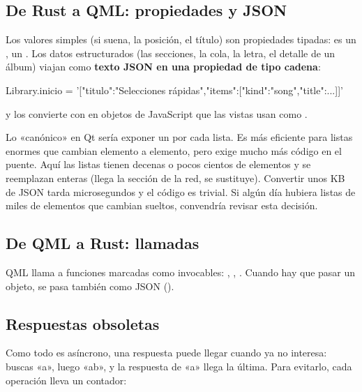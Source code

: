 \subsection{De Rust a QML: propiedades y JSON}

Los valores simples (si suena, la posición, el título) son propiedades tipadas:
 es un ,  un . Los datos
estructurados (las secciones, la cola, la letra, el detalle de un álbum) viajan como
\textbf{texto JSON en una propiedad de tipo cadena}:

\begin{codigo}
Library.inicio = '[{"titulo":"Selecciones rápidas","items":[{"kind":"song","title":...}]}]'
\end{codigo}

y  los convierte con  en objetos de JavaScript que las vistas
usan como .

\begin{porque}
Lo «canónico» en Qt sería exponer un  por cada lista. Es más
eficiente para listas enormes que cambian elemento a elemento, pero exige mucho más código en
el puente. Aquí las listas tienen decenas o pocos cientos de elementos y se reemplazan enteras
(llega la sección de la red, se sustituye). Convertir unos KB de JSON tarda microsegundos y el
código es trivial. Si algún día hubiera listas de miles de elementos que cambian sueltos,
convendría revisar esta decisión.
\end{porque}

\subsection{De QML a Rust: llamadas}

QML llama a funciones marcadas como invocables: ,
, . Cuando hay que
pasar un objeto, se pasa también como JSON ().

\subsection{Respuestas obsoletas}

Como todo es asíncrono, una respuesta puede llegar cuando ya no interesa: buscas «a», luego
«ab», y la respuesta de «a» llega la última. Para evitarlo, cada operación lleva un contador:

